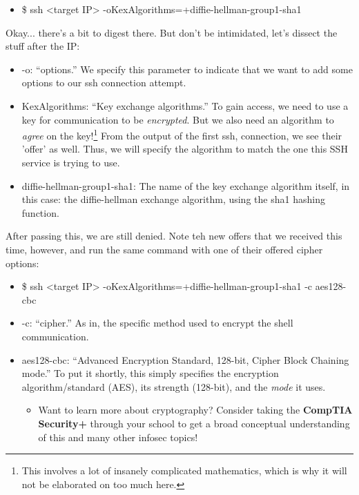\documentclass[a4paper,11pt]{article}
\renewcommand{\tt}[2][tt]{\textcolor{#1}{\ttfamily #2}}%
\begin{document}
\begin{itemize}
    \item \tt{\$ ssh <target IP> -oKexAlgorithms=+diffie-hellman-group1-sha1}
\end{itemize}
Okay... there's a bit to digest there. But don't be intimidated, let's dissect the stuff after the IP:
\begin{itemize}
    \item \tt{-o}: ``options.'' We specify this parameter to indicate that we want to add some options to our ssh connection attempt.
    \item \tt{KexAlgorithms}: ``Key exchange algorithms.'' To gain access, we need to use a key for communication to be \textit{encrypted}. But we also need an algorithm to \textit{agree} on the key!\footnote[2]{This involves a lot of insanely complicated mathematics, which is why it will not be elaborated on too much here.} From the output of the first ssh, connection, we see their '\tt{offer}' as well. Thus, we will specify the algorithm to match the one this SSH service is trying to use.
    \item \tt{diffie-hellman-group1-sha1}: The name of the key exchange algorithm itself, in this case: the \tt{diffie-hellman} exchange algorithm, using the \tt{sha1} hashing function.
\end{itemize}
After passing this, we are still denied. Note teh new \tt{offers} that we received this time, however, and run the same command with one of their offered \tt{cipher} options:
\begin{itemize}
    \item \tt{\$ ssh <target IP> -oKexAlgorithms=+diffie-hellman-group1-sha1 -c aes128-cbc}
    \item \tt{-c}: ``cipher.'' As in, the specific method used to encrypt the shell communication.
    \item \tt{aes128-cbc}: ``Advanced Encryption Standard, 128-bit, Cipher Block Chaining mode.'' To put it shortly, this simply specifies the encryption algorithm/standard (AES), its strength (128-bit), and the \textit{mode} it uses.
    \begin{itemize}
        \item Want to learn more about cryptography? Consider taking the {\bfseries CompTIA Security+} through your school to get a broad conceptual understanding of this and many other infosec topics!
    \end{itemize}
\end{itemize}
\end{document}
